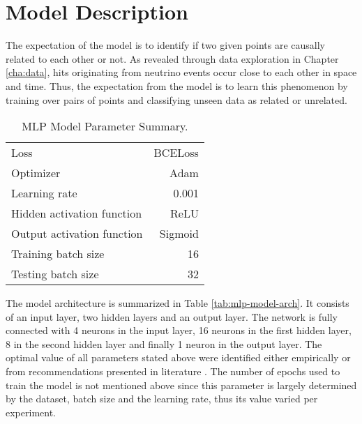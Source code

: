 \section{Model Description}
\label{sec:mlp-model-desc}

The expectation of the model is to identify if two given points are
causally related to each other or not. As revealed through data
exploration in Chapter \ref{cha:data}, hits originating
from neutrino events occur close to each other in space and time.
Thus, the expectation from the model is to learn this phenomenon by
training over pairs of points and classifying unseen data as related
or unrelated.

\begin{table}[htb]
  \centering
  \caption{MLP Model Parameter Summary.}
  \begin{tabular}{lr}
    \hline
    Loss & BCELoss \\
    Optimizer & Adam \\
    Learning rate & 0.001 \\
    Hidden activation function & ReLU\\
    Output activation function & Sigmoid \\
    Training batch size & 16 \\
    Testing batch size & 32 \\
    \hline
  \end{tabular}
  \label{tab:mlp-model-param}
\end{table}

The model architecture is summarized in Table
\ref{tab:mlp-model-arch}. It consists of an input layer, two hidden
layers and an output layer. The network is fully connected with 4
neurons in the input layer, 16 neurons in the first hidden layer, 8 in
the second hidden layer and finally 1 neuron in the output layer. The
optimal value of all parameters stated above were identified either
empirically or from recommendations presented in literature
\cite{bengio2012practical, goodfellow2016deep}. The number of
epochs used to train the model is not mentioned above since this
parameter is largely determined by the dataset, batch size and the
learning rate, thus its value varied per experiment.

